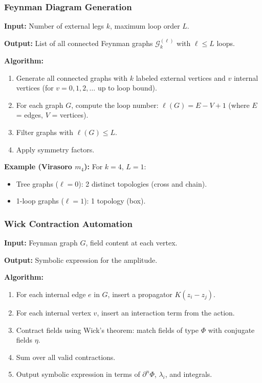 \subsubsection{Feynman Diagram Generation}

\textbf{Input:} Number of external legs $k$, maximum loop order $L$.

\textbf{Output:} List of all connected Feynman graphs $\mathcal{G}_k^{(\ell)}$ with $\ell \leq L$ loops.

\textbf{Algorithm:}
\begin{enumerate}
\item Generate all connected graphs with $k$ labeled external vertices and $v$ internal vertices (for $v = 0, 1, 2, \ldots$ up to loop bound).
\item For each graph $G$, compute the loop number: $\ell(G) = E - V + 1$ (where $E$ = edges, $V$ = vertices).
\item Filter graphs with $\ell(G) \leq L$.
\item Apply symmetry factors.
\end{enumerate}

\textbf{Example (Virasoro $m_4$):}
For $k=4$, $L=1$:
\begin{itemize}
\item Tree graphs ($\ell=0$): 2 distinct topologies (cross and chain).
\item 1-loop graphs ($\ell=1$): 1 topology (box).
\end{itemize}

\subsubsection{Wick Contraction Automation}

\textbf{Input:} Feynman graph $G$, field content at each vertex.

\textbf{Output:} Symbolic expression for the amplitude.

\textbf{Algorithm:}
\begin{enumerate}
\item For each internal edge $e$ in $G$, insert a propagator $K(z_i - z_j)$.
\item For each internal vertex $v$, insert an interaction term from the action.
\item Contract fields using Wick's theorem: match fields of type $\Phi$ with conjugate fields $\eta$.
\item Sum over all valid contractions.
\item Output symbolic expression in terms of $\partial^n \Phi$, $\lambda_i$, and integrals.
\end{enumerate}

